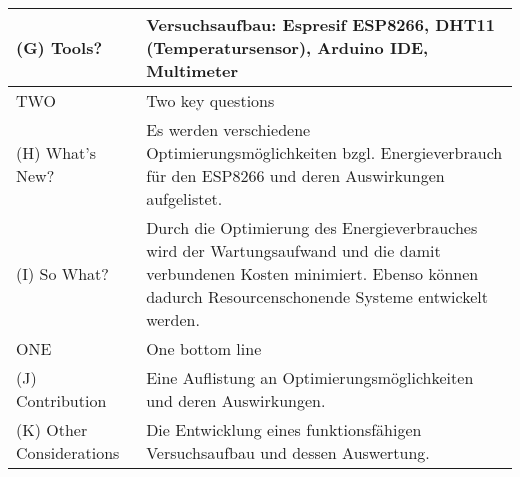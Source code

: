 \documentclass[10pt,table]{article}
\providecommand{\lgc}{\cellcolor{lightgray}}
\begin{document}
\begin{center}
\begin{longtable}{p{4.5cm}p{4cm}p{2.5cm}p{4cm}p{2.5cm}p{3.5cm}}
\lgc (G) Tools? & \multicolumn{5}{p{18cm}}{\textbf{Versuchsaufbau:} Espresif ESP8266, DHT11 (Temperatursensor), Arduino IDE, Multimeter } \\[1ex]
\midrule
\lgc  TWO & \multicolumn{5}{p{18cm}}{\lgc Two key questions} \\
\midrule
\lgc (H) What’s New?& \multicolumn{5}{p{18cm}}{ Es werden verschiedene Optimierungsmöglichkeiten bzgl. Energieverbrauch für den ESP8266 und deren Auswirkungen aufgelistet. } \\[1ex]
\lgc (I) So What? & \multicolumn{5}{p{18cm}}{ Durch die Optimierung des Energieverbrauches wird der Wartungsaufwand und die damit verbundenen Kosten minimiert. Ebenso können dadurch Resourcenschonende Systeme entwickelt werden. } \\[1ex]
\midrule
\lgc ONE & \multicolumn{5}{p{18cm}}{\lgc One bottom line} \\
\midrule
\lgc  (J) Contribution& \multicolumn{5}{p{18cm}}{Eine Auflistung an Optimierungsmöglichkeiten und deren Auswirkungen.} \\[1ex]
 \lgc (K) Other Considerations& \multicolumn{5}{p{18cm}}{Die Entwicklung eines funktionsfähigen Versuchsaufbau und dessen Auswertung.} \\[1ex]
\bottomrule   
\end{longtable}
\end{center}




\end{document}

